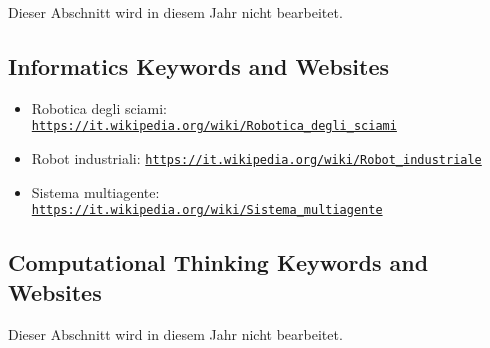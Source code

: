 \documentclass[a4paper,11pt]{report}
\newcommand{\BrochureUrlText}[1]{\texttt{#1}}
\begin{document}
Dieser Abschnitt wird in diesem Jahr nicht bearbeitet.


\subsection*{Informatics Keywords and Websites}

\begin{itemize}
  \item Robotica degli sciami: \href{https://it.wikipedia.org/wiki/Robotica_degli_sciami}{\BrochureUrlText{https://it.wikipedia.org/wiki/Robotica\_degli\_sciami}}
  \item Robot industriali: \href{https://it.wikipedia.org/wiki/Robot_industriale}{\BrochureUrlText{https://it.wikipedia.org/wiki/Robot\_industriale}}
  \item Sistema multiagente: \href{https://it.wikipedia.org/wiki/Sistema_multiagente}{\BrochureUrlText{https://it.wikipedia.org/wiki/Sistema\_multiagente}}
\end{itemize}


\subsection*{Computational Thinking Keywords and Websites}

Dieser Abschnitt wird in diesem Jahr nicht bearbeitet.
\end{document}
